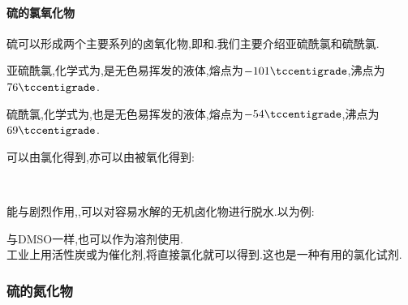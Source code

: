 \documentclass{ctexart}
\begin{document}
\paragraph{硫的氯氧化物}
硫可以形成两个主要系列的卤氧化物,即和.我们主要介绍亚硫酰氯和硫酰氯.
\begin{substance}[\ce{SOCl2}]
    亚硫酰氯,化学式为,是无色易挥发的液体,熔点为$-101\tccentigrade$,沸点为$76\tccentigrade$.
\end{substance}
\begin{substance}[\ce{SO2Cl2}]
    硫酰氯,化学式为,也是无色易挥发的液体,熔点为$-54\tccentigrade$,沸点为$69\tccentigrade$.
\end{substance}
可以由氯化得到,亦可以由被氧化得到:
\begin{center}
    \\
\end{center}
能与剧烈作用,,可以对容易水解的无机卤化物进行脱水.以为例:
\begin{center}
\end{center}
与DMSO一样,也可以作为溶剂使用.\\
\indent 工业上用活性炭或为催化剂,将直接氯化就可以得到.这也是一种有用的氯化试剂.
\subsubsection{硫的氮化物}
\end{document}
